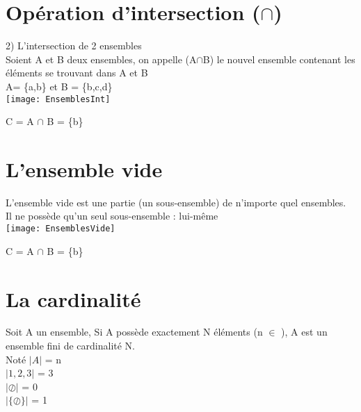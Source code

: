 \section{Opération d'intersection ($\cap$)}
\vspace{3mm} %

2) L'intersection de 2 ensembles \\

Soient A et B deux ensembles, on appelle (A$\cap$B) le nouvel ensemble contenant les éléments se trouvant dans A et B\\
A= \{a,b\} et B = \{b,c,d\} \\

\texttt{[image: EnsemblesInt]}

C = A $\cap$ B = \{b\} \\

\vspace{3mm} %
\section{L'ensemble vide}
\vspace{3mm} %

L'ensemble vide est une partie (un sous-ensemble) de n'importe quel ensembles.\\
Il ne possède qu'un seul sous-ensemble : lui-même \\

\texttt{[image: EnsemblesVide]}
\vspace{3mm} %

C = A $\cap$ B = \{b\} \\

\vspace{3mm} %
\section{La cardinalité}
\vspace{3mm} %

Soit A un ensemble, Si A possède exactement N éléments (n $\in$ \N), A est un ensemble fini de cardinalité N.\\
Noté $|A|$ = n \\

$|1,2,3|$ = 3 \\
$|\oslash|$ = 0 \\
$|\{\oslash\}|$ = 1 \\

